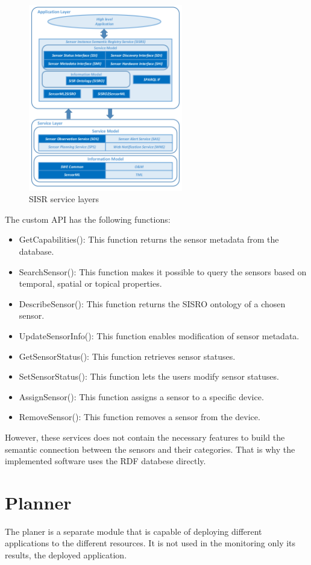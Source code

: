 \begin{figure}[h]
	\centering
	\includegraphics[width=0.6\textwidth]{figures/sisrserv.png}
	\caption{SISR service layers\label{fig:sisrserv}}
\end{figure}
The custom API has the following functions:
\begin{itemize}
\item GetCapabilities(): This function returns the sensor metadata from the database.
\item SearchSensor(): This function makes it possible to query the sensors based on temporal, spatial or topical properties.
\item DescribeSensor(): This function returns the SISRO ontology of a chosen sensor.
\item UpdateSensorInfo(): This function enables modification of sensor metadata.
\item GetSensorStatus(): This function retrieves sensor statuses.
\item SetSensorStatus(): This function lets the users modify sensor statuses.
\item AssignSensor(): This function assigns a sensor to a specific device.
\item RemoveSensor(): This function removes a sensor from the device.
\end{itemize}

However, these services does not contain the necessary features to build the semantic connection between the sensors and their categories. That is why the implemented software uses the RDF databese directly.

\section{Planner}
The planer is a separate module that is capable of deploying different applications to the different resources. It is not used in the monitoring only its results, the deployed application.


